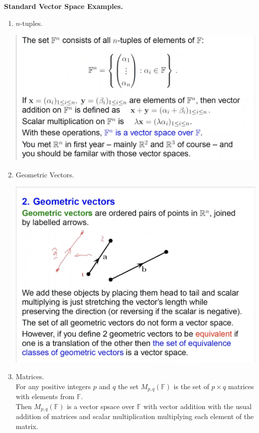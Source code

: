 \documentclass{article}
\begin{document}
\textbf{Standard Vector Space Examples.}
\begin{enumerate}
  \item $n$-tuples.\begin{center}
    \includegraphics[scale=0.3]{assets/vector_space_eg.png}\newpage
  \end{center}
  \item Geometric Vectors.\begin{center}
    \includegraphics[scale=0.10]{assets/geometric_vecs.png}
  \end{center}
  \item Matrices.\\For any positive integers $p$ and $q$ the set $M_{p,q}(\mathbb{F})$ is the set of $p \times q$ matrices with elements from $\mathbb{F}$.\\Then $M_{p,q}(\mathbb{F})$ is a vector spsace over $\mathbb{F}$ with vector addition with the usual addition of matrices and scalar multiplication multiplying each element of the matrix.

\end{enumerate}
\end{document}
